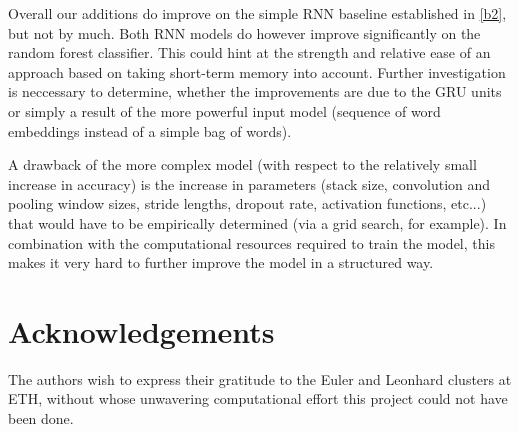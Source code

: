 \documentclass[10pt,conference,compsocconf]{IEEEtran}
\begin{document}
Overall our additions do improve on the simple RNN baseline
established in \autoref{b2}, but not by much. Both RNN models do
however improve significantly on the random forest classifier. This
could hint at the strength and relative ease of an approach based on
taking short-term memory into account. Further investigation is
neccessary to determine, whether the improvements are due to the GRU
units or simply a result of the more powerful input model (sequence of
word embeddings instead of a simple bag of words).

A drawback of the more complex model (with respect to the relatively
small increase in accuracy) is the increase in parameters (stack size,
convolution and pooling window sizes, stride lengths, dropout rate,
activation functions, etc...) that would have to be empirically
determined (via a grid search, for example). In combination with the
computational resources required to train the model, this makes it
very hard to further improve the model in a structured way.

\section*{Acknowledgements}

The authors wish to express their gratitude to the Euler and Leonhard
clusters at ETH, without whose unwavering computational effort this
project could not have been done.



\end{document}
